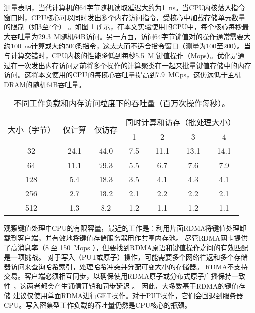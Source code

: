 测量表明，当代计算机的64字节随机读取延迟大约为1~ns。当CPU内核落入指令窗口时，CPU核心可以同时发出多个内存访问指令，受核心中加载存储单元数量的限制（如3至4个） \cite {gharachorloo1992hiding,han2010packetshader,zhang2015mega}。如图 \ref{kvdirect:tab:kv-cpu-throughput} 所示，在本文实验使用的CPU中，每个核心每秒最大吞吐量为29.3~M随机64B访问。另一方面，访问64字节键值对的操作通常需要大约100~ns计算或大约500条指令，这太大而不适合指令窗口（测量为100至200）。当与计算交错时，CPU内核的性能降低到每秒5.5~M 键值操作（Mops）。优化是通过在一次发出内存访问之前将多个操作的计算聚类在一起来批量键值存储中的内存访问\cite {li2016full,narula2014phase}。这将本文使用的CPU的每核心吞吐量提高到7.9~MOps，这仍远低于主机DRAM的随机64B吞吐量。


\begin{table}[htbp]
	\small
	\centering
	\caption{不同工作负载和内存访问粒度下的吞吐量（百万次操作每秒）。}
	\begin{tabular}{|c|c|c|c|c|c|c|}
		\hline
		\multirow{2}{*}{大小（字节）} & \multirow{2}{*}{仅计算} & \multirow{2}{*}{仅访存} & \multicolumn{4}{c|}{同时计算和访存（批处理大小）} \\\cline{4-7} 
		&  & & 1 & 2 & 3 & 4 \\\hline
		32 & 24.1 & 44.0 & 7.5 & 11.1 & 13.1 & 14.1 \\\hline
		64 & 11.1 & 29.3 & 5.5 & 6.7 & 7.6 & 7.9 \\\hline
		128 & 5.4 & 18.3 & 3.5 & 4.1 & 4.3 & 4.1 \\\hline
		256 & 2.7 & 13.2 & 2.1 & 2.2 & 2.2 & 2.1 \\\hline
		512 & 1.3 & 8.2 & 1.2 & 1.1 & 1.2 & 1.1 \\\hline
	\end{tabular}
	\label{kvdirect:tab:kv-cpu-throughput}
\end{table}


观察键值处理中CPU的有限容量，最近的工作是：利用片面RDMA将键值处理卸载到客户端，并有效地将键值存储服务器用作共享内存池。
尽管RDMA网卡提供了高消息率（8 至 150~Mops \cite {kalia2016design}），但要找到RDMA原语和键值操作之间的有效匹配是一项挑战。
对于写入（PUT或原子）操作，可能需要多个网络往返和多个存储器访问来查询哈希索引，处理哈希冲突并分配可变大小的存储器。
RDMA不支持交易。客户端必须相互同步，以确保使用RDMA原子或分布式原子广播保持一致性 \cite{szepesi2014designing}，这两者都会产生通信开销和同步延迟 \cite {mitchell2013using,dragojevic2014farm}。
因此，大多数基于RDMA的键值存储 \cite {mitchell2013using,dragojevic2014farm,kalia2014using}建议仅使用单面RDMA进行GET操作。对于PUT操作，它们会回退到服务器CPU。写入密集型工作负载的吞吐量仍然是CPU核心的瓶颈。

